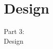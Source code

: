 \section{Design}
\begin{frame}
  \vspace{25mm}
  \begin{center}
    \Huge{Part 3:\\Design}
  \end{center}
\end{frame}
